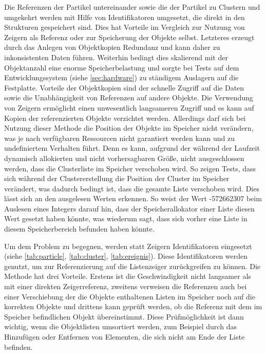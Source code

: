 Die Referenzen der Partikel untereinander sowie die der Partikel zu Clustern und umgekehrt werden mit Hilfe von Identifikatoren umgesetzt, die direkt in den Strukturen gespeichert sind. Dies hat Vorteile im Vergleich zur Nutzung von Zeigern als Referenz oder zur Speicherung der Objekte selbst. Letzteres erzeugt durch das Anlegen von Objektkopien Redundanz und kann daher zu inkonsistenten Daten führen. Weiterhin bedingt dies skalierend mit der Objektanzahl eine enorme Speicherbelastung und sorgte bei Tests auf dem Entwicklungssystem (siehe \autoref{sec:hardware}) zu ständigem Auslagern auf die Festplatte. Vorteile der Objektkopien sind der schnelle Zugriff auf die Daten sowie die Unabhängigkeit von Referenzen auf andere Objekte.
Die Verwendung von Zeigern ermöglicht einen unwesentlich langsameren Zugriff und es kann auf Kopien der referenzierten Objekte verzichtet werden. Allerdings darf sich bei Nutzung dieser Methode die Position der Objekte im Speicher nicht verändern, was je nach verfügbaren Ressourcen nicht garantiert werden kann und zu undefiniertem Verhalten führt. Denn es kann, aufgrund der während der Laufzeit dynamisch allokierten und nicht vorhersagbaren Größe, nicht ausgeschlossen werden, dass die Clusterliste im Speicher verschoben wird. So zeigen Tests, dass sich während der Clustererstellung die Position der Cluster im Speicher verändert, was dadurch bedingt ist, dass die gesamte Liste verschoben wird. Dies lässt sich an den ausgelesen Werten erkennen. So weist der Wert -572662307 beim Auslesen eines Integers darauf hin, dass der Speicherallokator einer Liste diesen Wert gesetzt haben könnte, was wiederum sagt, dass sich vorher eine Liste in diesem Speicherbereich befunden haben könnte.

Um dem Problem zu begegnen, werden statt Zeigern Identifikatoren eingesetzt (siehe \autoref{tab:particle}, \autoref{tab:cluster}, \autoref{tab:ereignis}).
Diese Identifikatoren werden genutzt, um zur Referenzierung auf die Listenzeiger zurückgreifen zu können. Die Methode hat drei Vorteile. Erstens ist die Geschwindigkeit nicht langsamer als mit einer direkten Zeigerreferenz, zweitens verweisen die Referenzen auch bei einer Verschiebung der die Objekte enthaltenen Listen im Speicher noch auf die korrekten Objekte und drittens kann geprüft werden, ob die Referenz mit dem im Speicher befindlichen Objekt übereinstimmt. Diese Prüfmöglichkeit ist dann wichtig, wenn die Objektlisten umsortiert werden, zum Beispiel durch das Hinzufügen oder Entfernen von Elementen, die sich nicht am Ende der Liste befinden.


